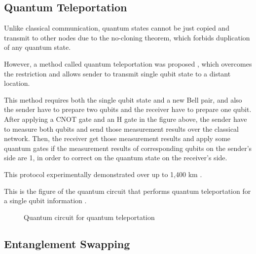 \subsection{Quantum Teleportation}

Unlike classical communication, quantum states cannot be just copied and transmit to other nodes due to the no-cloning theorem, which forbids duplication of any quantum state.  

However, a method called quantum teleportation was proposed \cite{PhysRevLett.70.1895}, which overcomes the restriction and allows sender to transmit single qubit state to a distant location. 
 		
This method requires both the single qubit state and a new Bell pair, and also the sender have to prepare two qubits and the receiver have to prepare one qubit. 
After applying a CNOT gate and an H gate in the figure above, the sender have to measure both qubits and send those measurement results over the classical network.  
Then, the receiver get those measurement results and apply some quantum gates if the measurement results of corresponding qubits on the sender's side are 1, in order to correct on the quantum state on the receiver's side.

This protocol experimentally demonstrated over up to 1,400 km \cite{ren2017ground}.

This is the figure of the quantum circuit that performs quantum teleportation for a single qubit information \cite{9023997}.

\begin{figure}[ht]
  	\begin{center}
	\caption{Quantum circuit for quantum teleportation}
	\end{center}
\end{figure}

\newpage

\subsection{Entanglement Swapping}

